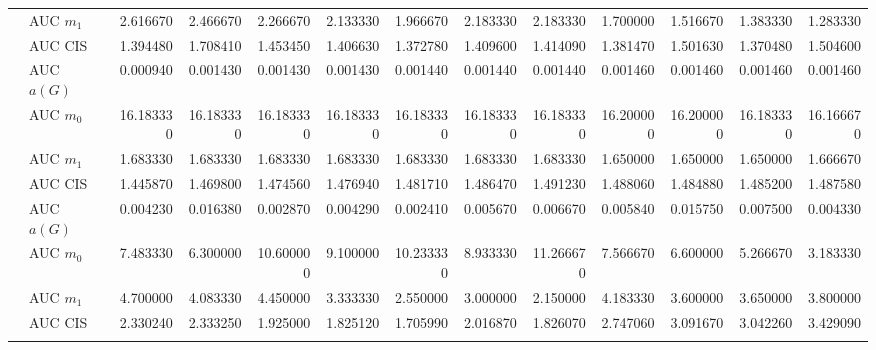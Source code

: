 \begin{table}[htbp]
\begin{tabular}{llrrrrrrrrrrr}
    & AUC $m_1$ & 2.616670 & 2.466670 & 2.266670 & 2.133330 & 1.966670 & 2.183330 & 2.183330 & 1.700000 & 1.516670 & 1.383330 & 1.283330 \\
    & AUC CIS & 1.394480 & 1.708410 & 1.453450 & 1.406630 & 1.372780 & 1.409600 & 1.414090 & 1.381470 & 1.501630 & 1.370480 & 1.504600 \\
    \addlinespace
    \multirow{4}{*}{degree} & AUC $a(G)$ & 0.000940 & 0.001430 & 0.001430 & 0.001430 & 0.001440 & 0.001440 & 0.001440 & 0.001460 & 0.001460 & 0.001460 & 0.001460 \\
    & AUC $m_0$ & 16.183330 & 16.183330 & 16.183330 & 16.183330 & 16.183330 & 16.183330 & 16.183330 & 16.200000 & 16.200000 & 16.183330 & 16.166670 \\
    & AUC $m_1$ & 1.683330 & 1.683330 & 1.683330 & 1.683330 & 1.683330 & 1.683330 & 1.683330 & 1.650000 & 1.650000 & 1.650000 & 1.666670 \\
    & AUC CIS & 1.445870 & 1.469800 & 1.474560 & 1.476940 & 1.481710 & 1.486470 & 1.491230 & 1.488060 & 1.484880 & 1.485200 & 1.487580 \\
    \addlinespace
    \multirow{4}{*}{random} & AUC $a(G)$ & 0.004230 & 0.016380 & 0.002870 & 0.004290 & 0.002410 & 0.005670 & 0.006670 & 0.005840 & 0.015750 & 0.007500 & 0.004330 \\
    & AUC $m_0$ & 7.483330 & 6.300000 & 10.600000 & 9.100000 & 10.233330 & 8.933330 & 11.266670 & 7.566670 & 6.600000 & 5.266670 & 3.183330 \\
    & AUC $m_1$ & 4.700000 & 4.083330 & 4.450000 & 3.333330 & 2.550000 & 3.000000 & 2.150000 & 4.183330 & 3.600000 & 3.650000 & 3.800000 \\
    & AUC CIS & 2.330240 & 2.333250 & 1.925000 & 1.825120 & 1.705990 & 2.016870 & 1.826070 & 2.747060 & 3.091670 & 3.042260 & 3.429090 \\
    \addlinespace
    \bottomrule
  \end{tabular}
\end{table}

